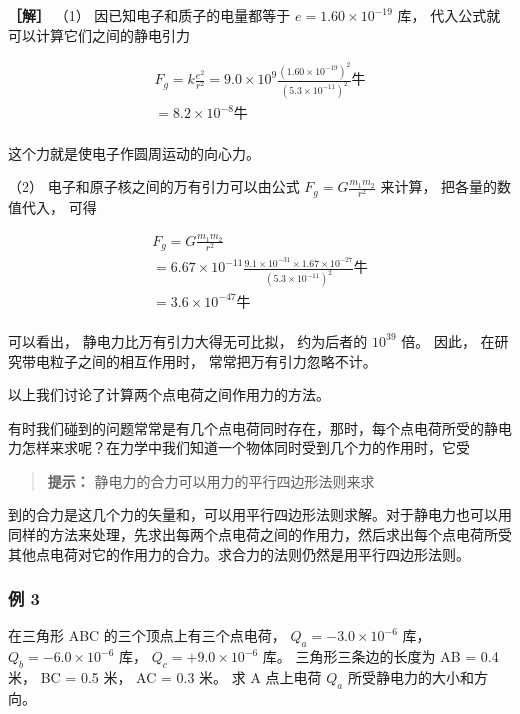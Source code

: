 \textbf{［解］} （1） 因已知电子和质子的电量都等于
\(e = 1.60 \times 10^{-19}\) 库， 代入公式就可以计算它们之间的静电引力

\[
\begin{array}{l} F_{g} = k \frac{e^{2}}{r^{2}} = 9.0 \times 10^{9} \frac{(1.60 \times 10^{- 19})^{2}}{(5.3 \times 10^{-11})^{2}} \text{牛} \\ = 8.2 \times 10^{- 8} \text{牛} \\ \end{array}
\]

这个力就是使电子作圆周运动的向心力。

（2） 电子和原子核之间的万有引力可以由公式
\(F_{g} = G \frac{m_{1}m_{2}}{r^{2}}\) 来计算， 把各量的数值代入， 可得

\[
\begin{array}{l} F_{g} = G \frac{m_{1} m_{2}}{r^{2}} \\ = 6.67 \times 10^{- 11} \frac{9.1 \times 10^{- 31} \times 1.67 \times 10^{- 27}}{(5.3 \times 10^{- 11})^{2}} \text{牛} \\ = 3.6 \times 10^{- 47} \text{牛} \\ \end{array}
\]

可以看出， 静电力比万有引力大得无可比拟， 约为后者的 \(10^{39}\) 倍。
因此， 在研究带电粒子之间的相互作用时， 常常把万有引力忽略不计。

以上我们讨论了计算两个点电荷之间作用力的方法。

有时我们碰到的问题常常是有几个点电荷同时存在，那时，每个点电荷所受的静电力怎样来求呢？在力学中我们知道一个物体同时受到几个力的作用时，它受

\begin{quote}
\textbf{提示：} 静电力的合力可以用力的平行四边形法则来求
\end{quote}

到的合力是这几个力的矢量和，可以用平行四边形法则求解。对于静电力也可以用同样的方法来处理，先求出每两个点电荷之间的作用力，然后求出每个点电荷所受其他点电荷对它的作用力的合力。求合力的法则仍然是用平行四边形法则。

\subsubsection{例 3}\label{ux4f8b-3}

在三角形 ABC 的三个顶点上有三个点电荷， \(Q_{a}=-3.0\times10^{-6}\) 库，
\(Q_{b}=-6.0\times10^{-6}\) 库， \(Q_{c}=+9.0\times10^{-6}\) 库。
三角形三条边的长度为 AB = 0.4 米， BC = 0.5 米， AC = 0.3 米。 求 A
点上电荷 \(Q_{a}\) 所受静电力的大小和方向。

